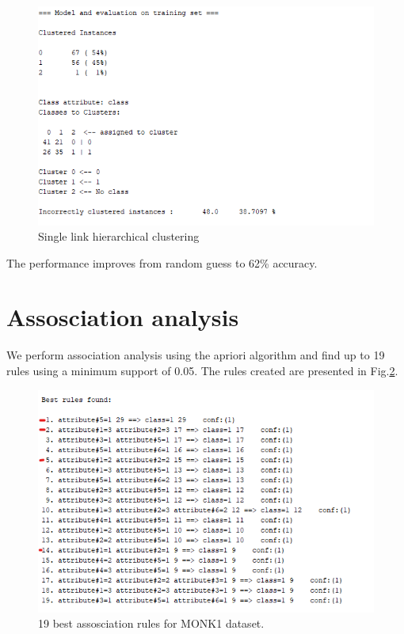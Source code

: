 \documentclass[letterpaper,12pt]{article}
\begin{document}
\begin{figure}[H] 
  \centering
      \includegraphics[width=0.8\columnwidth]{hierarch_single_link_3clusters_results}
        \caption{
                \label{fig:best_single_link}  
                Single link hierarchical clustering
        }
\end{figure}

The performance improves from random guess to 62\% accuracy.

\section{Assosciation analysis}

We perform association analysis using the apriori algorithm and find up to 19 rules using a minimum support of 0.05. The rules created are presented in Fig.\ref{fig:assosciation_rules}.

\begin{figure}[H] 
  \centering
      \includegraphics[width=0.8\columnwidth]{apriori_lab3}
        \caption{
                \label{fig:assosciation_rules}  
                19 best assosciation rules for MONK1 dataset.
        }
\end{figure}
\end{document}
